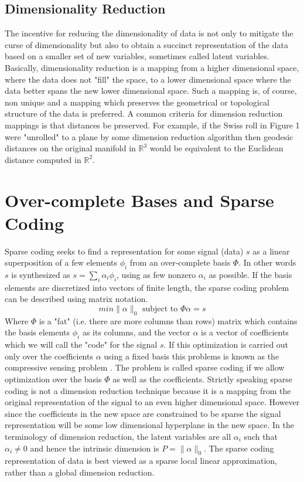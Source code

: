\documentclass[12pt,a4paper]{article}
\begin{document}
\subsection{Dimensionality Reduction} 
The incentive for reducing the dimensionality of data is not only to mitigate the curse of dimensionality but also to obtain a succinct representation of the data based on a smaller set of new variables, sometimes called latent variables. Basically, dimensionality reduction is a mapping from a higher dimensional space, where the data does not "fill" the space, to a lower dimensional space where the data better spans the new lower dimensional space. Such a mapping is, of course, non unique and a mapping which preserves the geometrical or topological structure of the data is preferred. A common criteria for dimension reduction mappings is that distances be preserved. For example, if the Swiss roll in Figure 1 were "unrolled" to a plane by some dimension reduction algorithm then geodesic distances on the original manifold in $\mathbb{R}^3$ would be equivalent to the Euclidean distance computed in $\mathbb{R}^2$. 

\section{Over-complete Bases and Sparse Coding}
Sparse coding seeks to find a representation for some signal (data) $s$ as a linear superposition of a few elements $\phi_i$ from an over-complete basis $\Phi$. In other words $s$ is synthesized as $s = \sum_i \alpha_i \phi_i$, using as few nonzero $\alpha_i$ as possible. If the basis elements are discretized into vectors of finite length, the sparse coding problem can be described using matrix notation. 
\begin{equation}
min \| \alpha \| _0 \mbox{ subject to } \Phi \alpha = s
\end{equation} 
Where $\Phi$ is a "fat" (i.e. there are more columns than rows) matrix which contains the basis elements $\phi_i$ as its columns, and the vector $\alpha$ is a vector of coefficients which we will call the "code" for the signal $s$. If this optimization is carried out only over the coefficients $\alpha$ using a fixed basis this problems is known as the compressive sensing problem \cite{Osher}. The problem is called sparse coding if we allow optimization over the basis $\Phi$ as well as the coefficients. Strictly speaking sparse coding is not a dimension reduction technique because it is a mapping from the original representation of the signal to an even higher dimensional space. However since the coefficients in the new space are constrained to be sparse the signal representation will be some low dimensional hyperplane in the new space. In the terminology of dimension reduction, the latent variables are all $\alpha_i$ such that $\alpha_i \neq 0$ and hence the intrinsic dimension is $P=\| \alpha \|_0$. The sparse coding representation of data is best viewed as a sparse local linear approximation, rather than a global dimension reduction. 
\end{document}
